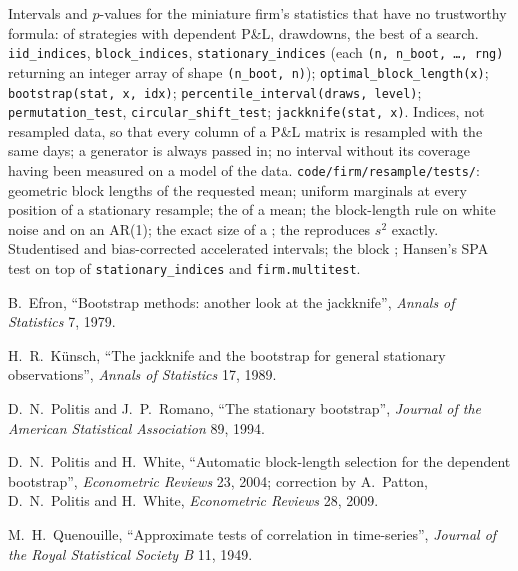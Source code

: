\begin{build}
 Intervals and $p$-values for the miniature firm's statistics that have no trustworthy formula:  of
strategies with dependent P\&L, drawdowns, the best of a search.
 \texttt{iid\_indices}, \texttt{block\_indices}, \texttt{stationary\_indices} (each \texttt{(n, n\_boot, \dots, rng)}
returning an integer array of shape \texttt{(n\_boot, n)}); \texttt{optimal\_block\_length(x)}; \texttt{bootstrap(stat, x, idx)};
\texttt{percentile\_interval(draws, level)}; \texttt{permutation\_test}, \texttt{circular\_shift\_test}; \texttt{jackknife(stat, x)}.
 Indices, not resampled data, so that every column of a P\&L matrix is resampled with the same days; a generator is always
passed in; no interval without its coverage having been measured on a model of the data.
 \texttt{code/firm/resample/tests/}: geometric block lengths of the requested mean; uniform marginals at every
position of a stationary resample; the   of a mean; the block-length rule on white noise and on an AR(1); the
exact size of a ; the  reproduces $s^2$ exactly.
 Studentised and bias-corrected accelerated intervals; the block ; Hansen's SPA test on top of
\texttt{stationary\_indices} and \texttt{firm.multitest}.
\end{build}

\begin{omsources}
\item B.~Efron, ``Bootstrap methods: another look at the jackknife'', \emph{Annals of Statistics} 7, 1979.
\item H.~R.~Künsch, ``The jackknife and the bootstrap for general stationary observations'', \emph{Annals of Statistics} 17, 1989.
\item D.~N.~Politis and J.~P.~Romano, ``The stationary bootstrap'', \emph{Journal of the American Statistical Association} 89, 1994.
\item D.~N.~Politis and H.~White, ``Automatic block-length selection for the dependent bootstrap'', \emph{Econometric Reviews} 23, 2004;
correction by A.~Patton, D.~N.~Politis and H.~White, \emph{Econometric Reviews} 28, 2009.
\item M.~H.~Quenouille, ``Approximate tests of correlation in time-series'', \emph{Journal of the Royal Statistical Society B} 11, 1949.
\end{omsources}

